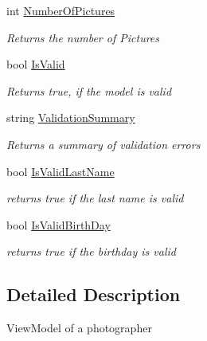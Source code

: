 \begin{DoxyCompactItemize}
int \mbox{\hyperlink{class_pic_d_b_1_1_view_models_1_1_photographer_view_model_a1de6fb084d4d4d7be50d88bd10ce492e}{Number\+Of\+Pictures}}
\begin{DoxyCompactList}\small\item\em Returns the number of Pictures \end{DoxyCompactList}\item 
bool \mbox{\hyperlink{class_pic_d_b_1_1_view_models_1_1_photographer_view_model_ac3cbc06cbc1e756f3b74c735e527f93c}{Is\+Valid}}
\begin{DoxyCompactList}\small\item\em Returns true, if the model is valid \end{DoxyCompactList}\item 
string \mbox{\hyperlink{class_pic_d_b_1_1_view_models_1_1_photographer_view_model_a153c30ed7c8bf193e66f7b37c6c647fb}{Validation\+Summary}}
\begin{DoxyCompactList}\small\item\em Returns a summary of validation errors \end{DoxyCompactList}\item 
bool \mbox{\hyperlink{class_pic_d_b_1_1_view_models_1_1_photographer_view_model_a67c41fb5d5b72b52354839994152bed4}{Is\+Valid\+Last\+Name}}
\begin{DoxyCompactList}\small\item\em returns true if the last name is valid \end{DoxyCompactList}\item 
bool \mbox{\hyperlink{class_pic_d_b_1_1_view_models_1_1_photographer_view_model_a1835bc73f6be63885ac8532113fa4263}{Is\+Valid\+Birth\+Day}}
\begin{DoxyCompactList}\small\item\em returns true if the birthday is valid \end{DoxyCompactList}\end{DoxyCompactItemize}


\subsection{Detailed Description}
View\+Model of a photographer 




